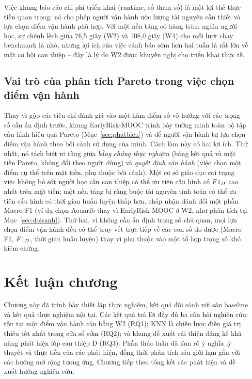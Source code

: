 Việc khung báo cáo chi phí triển khai (runtime, số tham số) là một lợi thế thực tiễn quan trọng: nó cho phép người vận hành ước lượng tài nguyên cần thiết và lựa chọn điểm vận hành phù hợp. Với một nền tảng có hàng trăm nghìn người học, sự chênh lệch giữa 76,5 giây (W2) và 108,0 giây (W4) cho mỗi lượt chạy benchmark là nhỏ, nhưng lợi ích của việc cảnh báo sớm hơn hai tuần là rất lớn về mặt cơ hội can thiệp -- đây là lý do W2 được khuyến nghị cho triển khai thực tế.

\subsection{Vai trò của phân tích Pareto trong việc chọn điểm vận hành}

Thay vì gộp các tiêu chí đánh giá vào một hàm điểm số vô hướng với các trọng số cần ấn định trước, khung EarlyRisk-MOOC trình bày tường minh toàn bộ tập cấu hình hiệu quả Pareto (Mục~\ref{sec:phatbieu}) và để người vận hành tự lựa chọn điểm vận hành theo bối cảnh sử dụng của mình. Cách làm này có hai lợi ích. Thứ nhất, nó tách biệt rõ ràng giữa \emph{bằng chứng thực nghiệm} (bảng kết quả và mặt tiền Pareto, không đổi theo người dùng) và \emph{quyết định vận hành} (việc chọn một điểm cụ thể trên mặt tiền, phụ thuộc bối cảnh). Một cơ sở giáo dục coi trọng việc không bỏ sót người học cần can thiệp có thể ưu tiên cấu hình có $F1_{D}$ cao nhất trên mặt tiền; một nền tảng bị ràng buộc tài nguyên tính toán có thể ưu tiên cấu hình có thời gian huấn luyện thấp hơn, chấp nhận đánh đổi một phần Macro-F1 (ví dụ chọn Aouarib thay vì EarlyRisk-MOOC ở W2, như phân tích tại Mục~\ref{sec:doisanh}). Thứ hai, vì không cần ấn định trọng số chủ quan, mọi lựa chọn điểm vận hành đều có thể truy vết trực tiếp về các con số đo được (Macro-F1, $F1_{D}$, thời gian huấn luyện) thay vì phụ thuộc vào một tổ hợp trọng số khó kiểm chứng.


\section{Kết luận chương}

Chương này đã trình bày thiết lập thực nghiệm, kết quả đối sánh với sáu baseline và kết quả thực nghiệm nội tại. Các kết quả trả lời đầy đủ ba câu hỏi nghiên cứu: tồn tại một điểm vận hành cân bằng W2 (RQ1); KNN là chiến lược điền giá trị thiếu tốt nhất trong cửa sổ sớm (RQ2); và khung đề xuất cải thiện đáng kể khả năng phát hiện lớp can thiệp D (RQ3). Phần thảo luận đã làm rõ ý nghĩa lý thuyết và thực tiễn của các phát hiện, đồng thời phân tích sáu giới hạn gắn với các hướng mở rộng tương ứng. Chương tiếp theo tổng kết các phát hiện và đề xuất hướng nghiên cứu.

\clearpage
